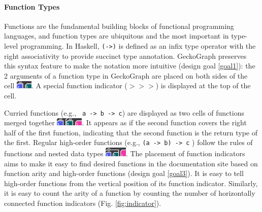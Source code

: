 \documentclass[preprint,12pt]{elsarticle}
\begin{document}
\paragraph{Function Types}
Functions are the fundamental building blocks of functional programming languages, and function types are ubiquitous and the most important in type-level programming. In Haskell, \texttt{(->)} is defined as an infix type operator with the right associativity to provide succinct type annotation. GeckoGraph preserves this syntax feature to make the notation more intuitive (design goal \ref{goal1}): the 2 arguments of a function type in GeckoGraph are placed on both sides of the cell \includegraphics[height=1em]{figures/Function.png}. A special function indicator (\texttt{$>>>$}) is displayed at the top of the cell. 

Curried functions (e.g., \texttt{ a -> b -> c}) are displayed as two cells of functions merged together \includegraphics[height=1em]{figures/Curry.png}. It appears as if the second function covers the right half of the first function, indicating that the second function is the return type of the first. Regular high-order functions (e.g., \texttt{(a -> b) -> c} ) follow the rules of functions and nested data types \includegraphics[height=1.2em]{figures/HOF.png}. The placement of function indicators aims to make it easy to find desired functions in the documentation site based on function arity and high-order functions (design goal \ref{goal3}). It is easy to tell high-order functions from the vertical position of its function indicator. Similarly, it is easy to count the arity of a function by counting the number of horizontally connected function indicators (Fig. \ref{fig:indicator}). 
\end{document}
